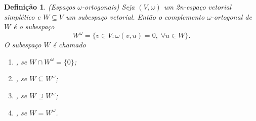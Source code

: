 \documentclass[12pt]{book}
\newtheorem{definicao}[teorema]{Definição}
\newcommand{\espacoSimpleticoOrtogonal}[1]{#1^{\omega}}
\begin{document}
	\begin{definicao}\label{definicao_subespaco_simpletico_ortogonais}
		(Espaços $\omega$-ortogonais) Seja $(V, \omega)$ um 2n-espaço vetorial simplético e $W\subseteq V$ um subespaço vetorial. Então o complemento $\omega$-ortogonal de $W$ é o subespaço
		$$
		W^{\omega} = \{v\in V: \omega(v,u) = 0,\;\forall u\in W \}.
		$$
		O subespaço $W$ é chamado
		
		\begin{enumerate}
			\item {}, se $W\cap \espacoSimpleticoOrtogonal{W} = \{0\}$;
			
			\item {}, se $W \subseteq \espacoSimpleticoOrtogonal{W}$;
			
			\item {}, se $W\supseteq \espacoSimpleticoOrtogonal{W}$;
			
			\item {}, se $W =\espacoSimpleticoOrtogonal{W}$.
		\end{enumerate}
	\end{definicao}
	
\end{document}
